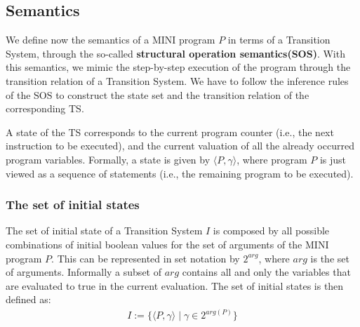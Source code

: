 \documentclass{article}
\begin{document}
\subsection{Semantics}
We define now the semantics of a MINI program $P$ in terms of a Transition System, through the so-called \textbf{structural operation semantics(SOS)}. With this semantics, we mimic the step-by-step execution of the program through the transition relation of a Transition System. We have to follow the inference rules of the SOS to construct the state set and the transition relation of the corresponding TS.

A state of the TS corresponds to the current program counter (i.e., the next instruction to be executed), and the current valuation of all the already occurred program variables.
Formally, a state is given by $\langle P, \gamma \rangle$, where program $P$ is just viewed as a sequence of statements (i.e., the remaining program to be executed). 

\subsubsection{The set of initial states}
The set of initial state of a Transition System $I$ is composed by all possible combinations of initial boolean values for the set of arguments of the MINI program $P$. This can be represented in set notation by $2^{arg}$, where $arg$ is the set of arguments. Informally a subset of $arg$ contains all and only the variables that are evaluated to true in the current evaluation. The set of initial states is then defined as:
\begin{align*}
    I := \{ \langle P, \gamma \rangle \mid \gamma \in 2^{arg(P)} \}
\end{align*}
\end{document}
